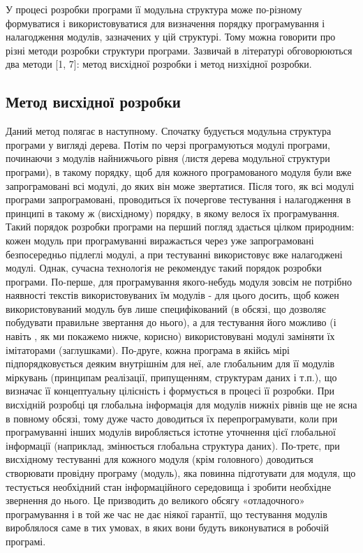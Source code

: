 \documentclass[a4paper,14pt, titlepage]{article}
\begin{document}
У процесі розробки програми її модульна структура може по-різному
формуватися і використовуватися для визначення порядку програмування і
налагодження модулів, зазначених у цій структурі. Тому можна говорити
про різні методи розробки структури програми. Зазвичай в літературі
обговорюються два методи [1, 7]: метод висхідної розробки і метод
низхідної розробки.

\subsection{Метод висхідної розробки}

Даний метод полягає в наступному. Спочатку будується модульна структура
програми у вигляді дерева. Потім по черзі програмуються модулі програми,
починаючи з модулів найнижчього рівня (листя дерева модульної
структури програми), в такому порядку, щоб для кожного програмованого
модуля були вже запрограмовані всі модулі, до яких він може звертатися.
Після того, як всі модулі програми запрограмовані, проводиться їх
почергове тестування і налагодження в принципі в такому ж (висхідному)
порядку, в якому велося їх програмування. Такий порядок розробки
програми на перший погляд здається цілком природним: кожен модуль при
програмуванні виражається через уже запрограмовані безпосередньо
підлеглі модулі, а при тестуванні використовує вже налагоджені модулі.
Однак, сучасна технологія не рекомендує такий порядок розробки програми.
По-перше, для програмування якого-небудь модуля зовсім не потрібно
наявності текстів використовуваних їм модулів - для цього досить, щоб
кожен використовуваний модуль був лише специфікований (в обсязі, що
дозволяє побудувати правильне звертання до нього), а для тестування його
можливо (і навіть , як ми покажемо нижче, корисно) використовувані
модулі заміняти їх імітаторами (заглушками). По-друге, кожна програма в
якійсь мірі підпорядковується деяким внутрішнім для неї, але глобальним
для її модулів міркувань (принципам реалізації, припущенням, структурам
даних і т.п.), що визначає її концептуальну цілісність і формується в
процесі її розробки. При висхідній розробці ця глобальна інформація для
модулів нижніх рівнів ще не ясна в повному обсязі, тому дуже часто
доводиться їх перепрограмувати, коли при програмуванні інших модулів
виробляється істотне уточнення цієї глобальної інформації (наприклад,
змінюється глобальна структура даних). По-третє, при висхідному
тестуванні для кожного модуля (крім головного) доводиться створювати
провідну програму (модуль), яка повинна підготувати для модуля, що
тестується необхідний стан інформаційного середовища і зробити необхідне
звернення до нього. Це призводить до великого обсягу «отладочного»
програмування і в той же час не дає ніякої гарантії, що тестування
модулів вироблялося саме в тих умовах, в яких вони будуть виконуватися в
робочій програмі.
\end{document}
